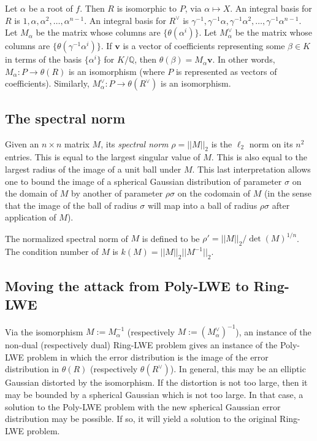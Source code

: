 \documentclass{llncs}
\newcommand{\QQ}{\mathbb{Q}}
\def \bfv{{\mathbf v}}
\newcommand{\<}{\langle}
\renewcommand{\>}{\rangle}
\begin{document}
Let $\alpha$ be a root of $f$.  Then $R$ is isomorphic to $P$, via $\alpha \mapsto X$.
An integral basis for $R$ is
        $1, \alpha, \alpha^2, \ldots, \alpha^{n-1}$.
An integral basis for $R^\vee$ is
$        \gamma^{-1}, \gamma^{-1}\alpha, \gamma^{-1}\alpha^2, \ldots, \gamma^{-1}\alpha^{n-1}$.
Let $M_\alpha$ be the matrix whose columns are $\{ \theta(\alpha^i) \}$.
Let $M^\vee_\alpha$ be the matrix whose columns are $\{ \theta(\gamma^{-1}\alpha^i) \}$.
If $\bfv$ is a vector of coefficients representing some $\beta \in K$ in terms of the basis $\{ \alpha^i \}$ for $K/\QQ$, then $\theta(\beta) = M_\alpha \bfv$.  In other words,
$M_\alpha: P \rightarrow \theta(R)$
is an isomorphism (where $P$ is represented as vectors of coefficients).  Similarly,
$M^\vee_\alpha: P \rightarrow \theta(R^\vee)$
is an isomorphism.




\subsection{The spectral norm}

Given an $n \times n$ matrix $M$, its \emph{spectral norm} $\rho = ||M||_2$ is the $\ell_2$ norm on its $n^2$ entries.  This is equal to the largest singular value of $M$.  This is also equal to the largest radius of the image of a unit ball under $M$.  This last interpretation allows one to bound the image of a spherical Gaussian distribution of parameter $\sigma$ on the domain of $M$ by another of parameter $\rho \sigma$ on the codomain of $M$ (in the sense that the image of the ball of radius $\sigma$ will map into a ball of radius $\rho \sigma$ after application of $M$).

The normalized spectral norm of $M$ is defined to be $\rho ' = ||M||_2/\det(M)^{1/n}$.
The condition number of $M$ is $k(M) = ||M||_2||M^{-1}||_2$.

\subsection{Moving the attack from Poly-LWE to Ring-LWE}
\label{sec:movingsub}

Via the isomorphism $M:=M_\alpha^{-1}$ (respectively $M:=(M^\vee_\alpha)^{-1}$), an instance of the non-dual (respectively dual) Ring-LWE problem gives an instance of the Poly-LWE problem in which the error distribution is the image of the error distribution in $\theta(R)$ (respectively $\theta(R^\vee)$).  In general, this may be an elliptic Gaussian distorted by the isomorphism.  If the distortion is not too large, then it may be bounded by a spherical Gaussian which is not too large.  In that case, a solution to the Poly-LWE problem with the new spherical Gaussian error distribution may be possible.  If so, it will yield a solution to the original Ring-LWE problem.
\end{document}
